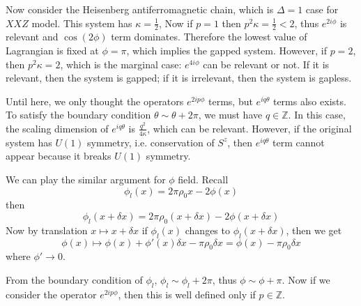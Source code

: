 Now consider the Heisenberg antiferromagnetic chain, which is $\Delta=1$ case for $XXZ$ model. This system has $\kappa=\frac{1}{2}$, Now if $p=1$ then $p^2 \kappa=\frac{1}{2}<2$, thus $e^{2i\phi}$ is relevant and $\cos(2\phi)$ term dominates. Therefore the lowest value of Lagrangian is fixed at $\phi=\pi$, which implies the gapped system. However, if $p=2$, then $p^2\kappa=2$, which is the marginal case: $e^{4i\phi}$ can be relevant or not. If it is relevant, then the system is gapped; if it is irrelevant, then the system is gapless.

Until here, we only thought the operators $e^{2ip\phi}$ terms, but $e^{iq\theta}$ terms also exists. To satisfy the boundary condition $\theta\sim \theta+2\pi$, we must have $q\in \mathbb{Z}$. In this case, the scaling dimension of $e^{iq\theta}$ is $\frac{q^2}{4\kappa}$, which can be relevant. However, if the original system has $U(1)$ symmetry, i.e. conservation of $S^z$, then $e^{iq\theta}$ term cannot appear because it breaks $U(1)$ symmetry.

We can play the similar argument for $\phi$ field. Recall
\begin{equation}
\phi_l(x)=2\pi\rho_0 x-2\phi(x)
\end{equation}
then
\begin{equation}
\phi_l(x+\delta x)=2\pi \rho_0(x+\delta x)-2\phi(x+\delta x)
\end{equation}
Now by translation $x\mapsto x+\delta x$ if $\phi_l(x)$ changes to $\phi_l(x+\delta x)$, then we get
\begin{equation}
\phi(x)\mapsto \phi(x)+\phi'(x)\delta x-\pi \rho_0\delta x=\phi(x)-\pi \rho_0\delta x
\end{equation}
where $\phi'\rightarrow 0$.

From the boundary condition of $\phi_l$, $\phi_l\sim \phi_l+2\pi$, thus $\phi\sim \phi+\pi$. Now if we consider the operator $e^{2ip\phi}$, then this is well defined only if $p\in \mathbb{Z}$.

